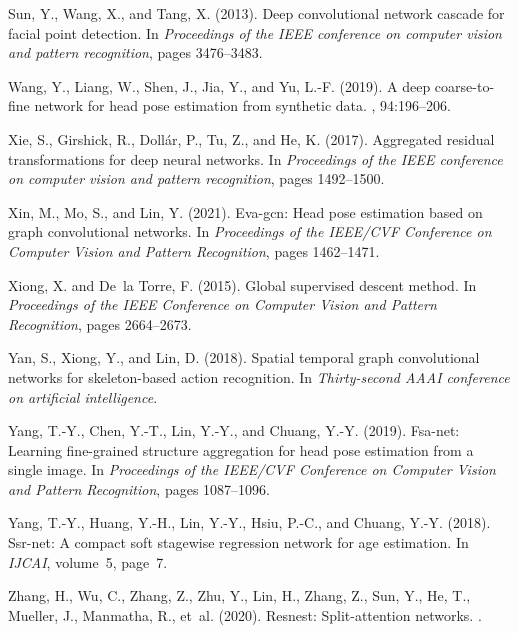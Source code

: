 \documentclass[a4paper,twoside]{article}
\begin{document}
{\begin{thebibliography}{}
Sun, Y., Wang, X., and Tang, X. (2013).
\newblock Deep convolutional network cascade for facial point detection.
\newblock In {\em Proceedings of the IEEE conference on computer vision and
  pattern recognition}, pages 3476--3483.

Wang, Y., Liang, W., Shen, J., Jia, Y., and Yu, L.-F. (2019).
\newblock A deep coarse-to-fine network for head pose estimation from synthetic
  data.
, 94:196--206.

Xie, S., Girshick, R., Doll{\'a}r, P., Tu, Z., and He, K. (2017).
\newblock Aggregated residual transformations for deep neural networks.
\newblock In {\em Proceedings of the IEEE conference on computer vision and
  pattern recognition}, pages 1492--1500.

Xin, M., Mo, S., and Lin, Y. (2021).
\newblock Eva-gcn: Head pose estimation based on graph convolutional networks.
\newblock In {\em Proceedings of the IEEE/CVF Conference on Computer Vision and
  Pattern Recognition}, pages 1462--1471.

Xiong, X. and De~la Torre, F. (2015).
\newblock Global supervised descent method.
\newblock In {\em Proceedings of the IEEE Conference on Computer Vision and
  Pattern Recognition}, pages 2664--2673.

Yan, S., Xiong, Y., and Lin, D. (2018).
\newblock Spatial temporal graph convolutional networks for skeleton-based
  action recognition.
\newblock In {\em Thirty-second AAAI conference on artificial intelligence}.

Yang, T.-Y., Chen, Y.-T., Lin, Y.-Y., and Chuang, Y.-Y. (2019).
\newblock Fsa-net: Learning fine-grained structure aggregation for head pose
  estimation from a single image.
\newblock In {\em Proceedings of the IEEE/CVF Conference on Computer Vision and
  Pattern Recognition}, pages 1087--1096.

Yang, T.-Y., Huang, Y.-H., Lin, Y.-Y., Hsiu, P.-C., and Chuang, Y.-Y. (2018).
\newblock Ssr-net: A compact soft stagewise regression network for age
  estimation.
\newblock In {\em IJCAI}, volume~5, page~7.

Zhang, H., Wu, C., Zhang, Z., Zhu, Y., Lin, H., Zhang, Z., Sun, Y., He, T.,
  Mueller, J., Manmatha, R., et~al. (2020).
\newblock Resnest: Split-attention networks.
.


\end{thebibliography}}
\end{document}
